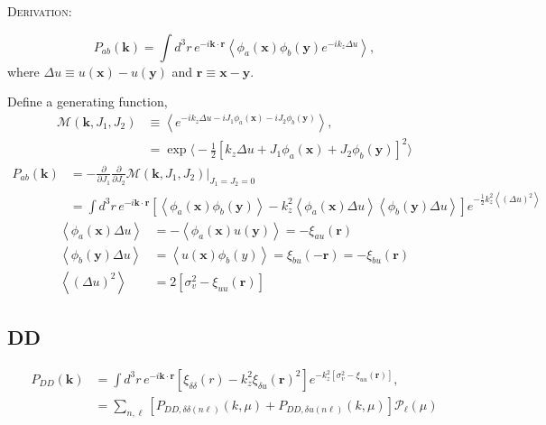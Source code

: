 \documentclass[a4paper,11pt, fleqn]{article}
\begin{document}
\vspace{5mm}
\textsc{Derivation}:

\begin{equation}
  P_{ab}(\bm{k}) = \int\! d^3 r \, e^{-i\bm{k}\cdot\bm{r}} \left\langle
                   \phi_a(\bm{x}) \phi_b(\bm{y}) e^{-ik_z \Delta u} \right\rangle,
\end{equation}
%
where $\Delta u \equiv u(\bm{x}) - u(\bm{y})$ and
$\bm{r} \equiv \bm{x} - \bm{y}$.

Define a generating function,
\begin{align}
  \mathcal{M}(\bm{k}, J_1, J_2)
  &\equiv \left\langle e^{-ik_z \Delta u -i J_1 \phi_a(\bm{x}) -i J_2 \phi_b(\bm{y})}
          \right\rangle,\\
  &= \exp \Big\langle -\frac{1}{2} \left[ k_z \Delta u
            + J_1 \phi_a(\bm{x}) + J_2 \phi_b(\bm{y}) \right]^2 \Big\rangle
\end{align}
%
\begin{align}
  P_{ab}(\bm{k}) &= -\frac{\partial}{\partial J_1} \frac{\partial}{\partial J_2}
  \mathcal{M}(\bm{k}, J_1, J_2) \Big|_{J_1 = J_2 = 0}\\
%
  &= \int\! d^3 r \, e^{-i\bm{k}\cdot\bm{r}}
  \left[
    \left\langle \phi_a(\bm{x}) \phi_b(\bm{y}) \right\rangle
    - k_z^2 \left\langle \phi_a(\bm{x}) \Delta u\right\rangle
      \left\langle \phi_b(\bm{y}) \Delta u\right\rangle    
  \right] e^{-\frac{1}{2} k_z^2 \left\langle (\Delta u)^2 \right\rangle}
\end{align}
%
\begin{align}
  \left\langle \phi_a(\bm{x}) \Delta u \right\rangle
    &= -\left\langle \phi_a(\bm{x}) u(\bm{y}) \right\rangle
     = -\xi_{au}(\bm{r})\\
  \left\langle \phi_b(\bm{y}) \Delta u \right\rangle
    &= \left\langle u(\bm{x}) \phi_b(y) \right\rangle
     = \xi_{bu}(-\bm{r}) = -\xi_{bu}(\bm{r})\\
  \left\langle (\Delta u)^2 \right\rangle
  &= 2 \left[\sigma_v^2 - \xi_{uu}(\bm{r})\right]
\end{align}

%
%
\clearpage
\subsection{DD}

\begin{align}
  P_{DD}(\bm{k}) &= \int \!\! d^3 r \, e^{-i\bm{k}\cdot\bm{r}}
  \left[ \xi_{\delta\delta}(r) - k_z^2 \xi_{\delta u}(\bm{r})^2 \right]
  e^{-k_z^2 [\sigma_v^2 - \xi_{uu}(\bm{r})]},\\
  &=
  \sum_{n, \ell} \left[ P_{DD, \delta\delta(n\ell)}(k, \mu)
  + P_{DD, \delta u(n\ell)}(k, \mu) \right] \mathcal{P}_\ell(\mu)
\end{align}
\end{document}
